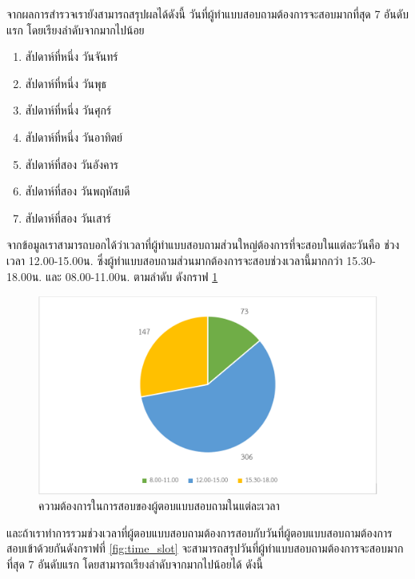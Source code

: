 จากผลการสำรวจเรายังสามารถสรุปผลได้ดังนี้
วันที่ผู้ทำแบบสอบถามต้องการจะสอบมากที่สุด 7 อันดับแรก โดยเรียงลำดับจากมากไปน้อย
\begin{enumerate}
  \item สัปดาห์ที่หนึ่ง วันจันทร์
  \item สัปดาห์ที่หนึ่ง วันพุธ
  \item สัปดาห์ที่หนึ่ง วันศุกร์ 
  \item สัปดาห์ที่หนึ่ง วันอาทิตย์
  \item สัปดาห์ที่สอง วันอังคาร
  \item สัปดาห์ที่สอง วันพฤหัสบดี
  \item สัปดาห์ที่สอง วันเสาร์
\end{enumerate}

จากข้อมูลเราสามารถบอกได้ว่าเวลาที่ผู้ทำแบบสอบถามส่วนใหญ่ต้องการที่จะสอบในแต่ละวันคือ
ช่วงเวลา 12.00-15.00น. ซึ่งผู้ทำแบบสอบถามส่วนมากต้องการจะสอบช่วงเวลานี้มากกว่า 15.30-18.00น. และ 08.00-11.00น. ตามลำดับ ดังกราฟ \ref{fig:time}
\begin{figure}
  \begin{center}
    \includegraphics[width=\linewidth]{images/pie_chart_for_final_exam_time.png}
  \end{center}
  \caption[Poem]{ความต้องการในการสอบของผู้ตอบแบบสอบถามในแต่ละเวลา}
  \label{fig:time}
\end{figure}
และถ้าเราทำการรวมช่วงเวลาที่ผู้ตอบแบบสอบถามต้องการสอบกับวันที่ผู้ตอบแบบสอบถามต้องการสอบเข้าด้วยกันดังกราฟที่ \ref{fig:time_slot} จะสามารถสรุปวันที่ผู้ทำแบบสอบถามต้องการจะสอบมากที่สุด 7 อันดับแรก โดยสามารถเรียงลำดับจากมากไปน้อยได้ ดังนี้
